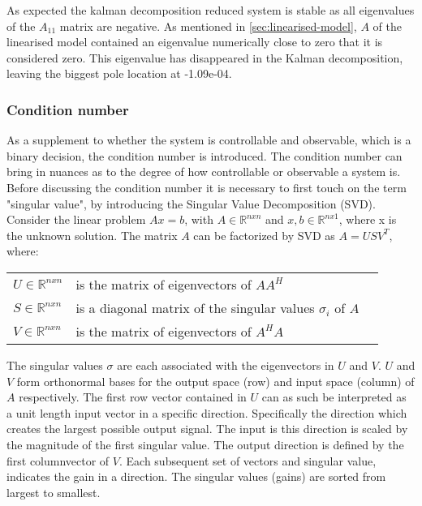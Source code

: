 As expected the kalman decomposition reduced system is stable as all eigenvalues of the $A_{11}$ matrix are negative. As mentioned in \cref{sec:linearised-model}, $A$ of the linearised model contained an eigenvalue numerically close to zero that it is considered zero. This eigenvalue has disappeared in the Kalman decomposition, leaving the biggest pole location at -1.09e-04.


\subsubsection{Condition number} \label{sec:condNumber}
As a supplement to whether the system is controllable and observable, which is a binary decision, the condition number is introduced. The condition number can bring in nuances as to the degree of how controllable or observable a system is. Before discussing the condition number it is necessary to first touch on the term "singular value", by introducing the Singular Value Decomposition (SVD).\\

Consider the linear problem $Ax=b$, with $A \in \mathbb{R} ^{n x n}$ and $ x, b \in \mathbb{R} ^{n x 1}$, where x is the unknown solution. The matrix $A$ can be factorized by SVD as $A = USV^T$, where:
\begin{center}
	\begin{tabular}{l p{8cm} l}
		$U \in \mathbb{R} ^{n x n}$		& is the matrix of eigenvectors of $AA^H$  &  \\
		$S \in \mathbb{R} ^{n x n}$ 	& is a diagonal matrix of the singular values $\sigma_i$ of $A$ &  \\
		$V \in \mathbb{R} ^{n x n}$		& is the matrix of eigenvectors of $A^HA$  &  \\
	\end{tabular}
\end{center}

The singular values $\sigma$ are each associated with the eigenvectors in $U$ and $V$. $U$ and $V$ form orthonormal bases for the output space (row) and input space (column) of $A$ respectively. The first row vector contained in $U$ can as such be interpreted as a unit length input vector in a specific direction. Specifically the direction which creates the largest possible output signal. The input is this direction is scaled by the magnitude of the first singular value. The output direction is defined by the first columnvector of $V$. Each subsequent set of vectors and singular value, indicates the gain in a direction. The singular values (gains) are sorted from largest to smallest.

